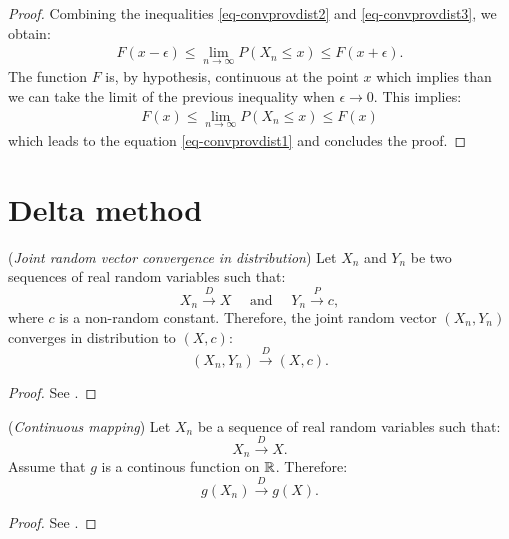 \documentclass{article}
\begin{document}
\begin{proof}
Combining the inequalities \ref{eq-convprovdist2} and \ref{eq-convprovdist3}, we obtain: 
\begin{align*}
F(x-\epsilon) \leq \lim_{n\rightarrow \infty} P(X_n\leq x)  \leq F(x+\epsilon).
\end{align*}
The function $F$ is, by hypothesis, continuous at the point $x$ which implies than we can take 
the limit of the previous inequality when $\epsilon\rightarrow 0$. 
This implies:
\begin{align*}
F(x) \leq \lim_{n\rightarrow \infty} P(X_n\leq x)  \leq F(x)
\end{align*}
which leads to the equation \ref{eq-convprovdist1} and concludes the proof.
\end{proof}


\section{Delta method}




\begin{theorem}
\label{theo-jointrandomvector}
(\emph{Joint random vector convergence in distribution})
Let $X_n$ and $Y_n$ be two sequences of real random variables such that:
$$
X_n \xrightarrow{D} X \quad \textrm{ and } \quad Y_n \xrightarrow{P} c,
$$
where $c$ is a non-random constant. 
Therefore, the joint random vector $(X_n,Y_n)$ converges in distribution to $(X,c)$:
$$
(X_n,Y_n) \xrightarrow{D} (X, c) .
$$
\end{theorem}

\begin{proof}
See \cite{Vaart2000}.
\end{proof}


\begin{theorem}
\label{theo-continuousmap}
(\emph{Continuous mapping})
Let $X_n$ be a sequence of real random variables such that:
$$
X_n \xrightarrow{D} X.
$$
Assume that $g$ is a continous function on $\mathbb{R}$. 
Therefore:
$$
g(X_n) \xrightarrow{D} g(X).
$$
\end{theorem}

\begin{proof}
See \cite{Vaart2000}.
\end{proof}
\end{document}
